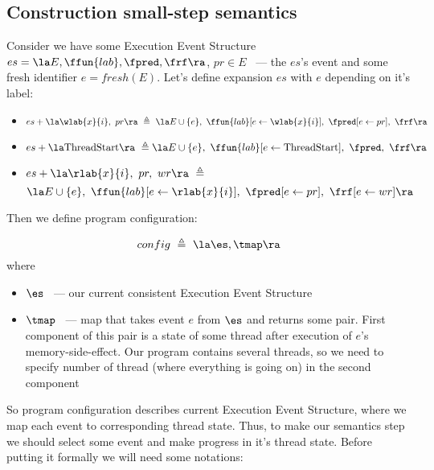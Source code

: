 \subsection{Construction small-step semantics}
Consider we have some Execution Event Structure $es = \la E, \ffun{lab}, \fpred, \frf \ra$, $pr \in E$ ~--- the $es$'s event and some fresh identifier $e = fresh(E)$. Let's define expansion $es$ with $e$ depending on it's label:
\begin{definition}
  \begin{itemize}
    \item $es + \la \wlab{x}{i}, \ pr \ra \ \triangleq \vspace{1mm} \\ \ 
    \la E \cup \{e\}, \
        \ffun{lab}[e \leftarrow \wlab{x}{i}], \
        \fpred[e \leftarrow pr], \
        \frf \ra\ $
        \vspace{1mm}
    \item $es + \la \text{ThreadStart} \ra \ \triangleq \vspace{1mm} \\
    \la E \cup \{e\}, \
    \ffun{lab}[e \leftarrow \text{ThreadStart}], \
    \fpred, \
    \frf \ra\ $
    \vspace{1mm}
    \item $es + \la \rlab{x}{i}, \ pr, \ wr \ra \ \triangleq$
    $$\la E \cup \{e\}, \
    \ffun{lab}[e \leftarrow \rlab{x}{i}], \
    \fpred[e \leftarrow pr], \
    \frf[e \leftarrow wr] \ra\ $$
  \end{itemize}

\end{definition}
Then we define program configuration:
\begin{definition}[configuration]
  $$config \ \triangleq \ \la \es, \tmap \ra$$
  where
  \begin{itemize}
    \item $\es$ ~--- our current consistent Execution Event Structure
    \item $\tmap$ ~--- map that takes event $e$ from $\es$ and returns some pair. First component of this pair is a state of some thread after execution of $e$'s memory-side-effect. Our program contains several threads, so we need to specify number of thread (where everything is going on) in the second component
  \end{itemize}
\end{definition}
So program configuration describes current Execution Event Structure, where we map each event to corresponding thread state. Thus, to make our semantics step we should select some event and make progress in it's thread state. Before putting it formally we will need some notations:


